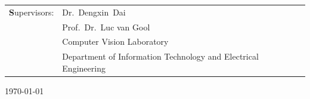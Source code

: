 \begin{titlepage}
\begin{center}

\end{center}


\vfill
\begin{center}
\begin{tabular}{ll}
\Large{\textbf Supervisors:} &  \Large{Dr.~Dengxin~Dai}\\ 
                             &  \Large{Prof.~Dr.~Luc van Gool}\\
 			    & \small{Computer Vision Laboratory}\\
			    & \small{Department of Information Technology and Electrical Engineering}\\
\end{tabular}
\end{center}

\begin{center}
\today\\
\end{center}


\end{titlepage}
